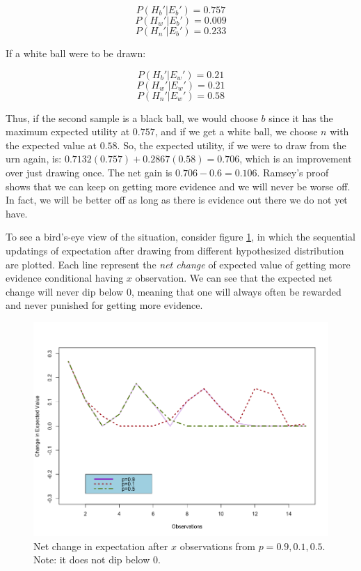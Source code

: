 \[P(H_b'|E_b') = 0.757\] \[P(H_w'|E_b') = 0.009\]
\[P(H_n'|E_b') = 0.233\]

If a white ball were to be drawn:

\[P(H_b'|E_w') = 0.21\] \[P(H_w'|E_w') = 0.21\] \[P(H_n'|E_w') = 0.58\]

Thus, if the second sample is a black ball, we would choose \(b\) since
it has the maximum expected utility at \(0.757\), and if we get a white
ball, we choose \(n\) with the expected value at \(0.58\). So, the
expected utility, if we were to draw from the urn again, is:
\(0.7132(0.757) + 0.2867(0.58) = 0.706\), which is an improvement over
just drawing once. The net gain is \(0.706 - 0.6 = 0.106\). Ramsey's
proof shows that we can keep on getting more evidence and we will never
be worse off. In fact, we will be better off as long as there is
evidence out there we do not yet have.

To see a bird's-eye view of the situation, consider figure \ref{fig:expectedchange}, in which the sequential updatings of expectation after drawing from different hypothesized distribution are plotted. Each line represent the \emph{net change} of expected value of getting more evidence conditional having $x$ observation. We can see that the expected net change will never dip below $0$, meaning that one will always often be rewarded and never punished for getting more evidence.

\begin{figure}[h] 
\begin{center}
\includegraphics[scale=0.5]{Expectedchange.png}
	\caption{Net change in expectation after $x$ observations from $p=0.9,0.1,0.5$. Note: it does not dip below 0.}
	\label{fig:expectedchange}
\end{center}	
\end{figure}


